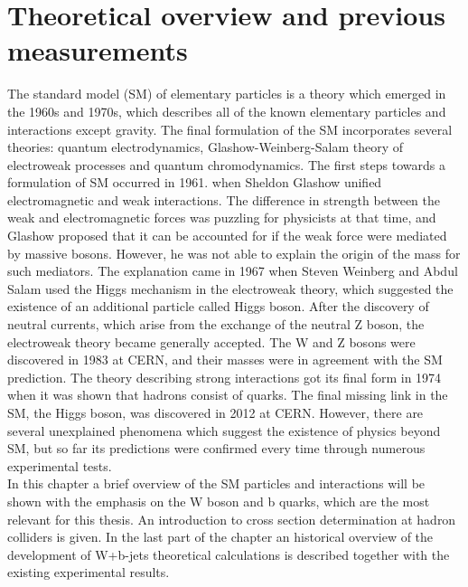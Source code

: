 
\chapter{Theoretical overview and previous measurements} %

\label{Chapter2} 


The standard model (SM) of elementary particles is a theory which emerged in the 1960s and 1970s, which describes all of the known elementary particles and interactions except gravity. The final formulation of the SM incorporates several theories: quantum electrodynamics, Glashow-Weinberg-Salam theory of electroweak processes and quantum chromodynamics. The first steps towards a formulation of SM occurred in 1961. when Sheldon Glashow unified electromagnetic and weak interactions\cite{Glashow1961579}. The difference in strength between the weak and electromagnetic forces was puzzling for physicists at that time, and Glashow proposed that it can be accounted for if the weak force were mediated by massive bosons. However, he was not able to explain the origin of the mass for such mediators. The explanation came in 1967 when Steven Weinberg and Abdul Salam used the Higgs mechanism in the electroweak theory\cite{PhysRevLett.19.1264,Salam:1968rm}, which suggested the existence of an additional particle called Higgs boson. After the discovery of neutral currents, which arise from the exchange of the neutral Z boson, the electroweak theory became generally accepted. The W and Z bosons were discovered in 1983 at CERN\cite{Arnison1983103,Arnison1983398}, and their masses were in agreement with the SM prediction. The theory describing strong interactions got its final form in 1974 when it was shown that hadrons consist of quarks. The final missing link in the SM, the Higgs boson, was discovered in 2012 at CERN\cite{Aad:2012tfa,Chatrchyan:2012ufa}. However, there are several unexplained phenomena which suggest the existence of physics beyond SM, but so far its predictions were confirmed every time through numerous experimental tests.  \\
In this chapter a brief overview of the SM particles and interactions will be shown with the emphasis on the W boson and b quarks, which are the most relevant for this thesis. An introduction to cross section determination at hadron colliders is given. In the last part of the chapter an historical overview of the development of W+b-jets theoretical calculations is described together with the existing experimental results.


